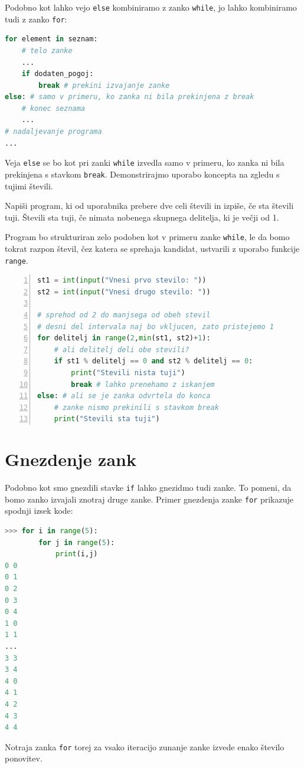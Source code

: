 Podobno kot lahko vejo \texttt{else} kombiniramo z zanko \texttt{while}, jo lahko kombiniramo tudi z zanko \texttt{for}:
\begin{lstlisting}[language=Python, showstringspaces=false]
for element in seznam:
    # telo zanke
    ...
    if dodaten_pogoj:
        break # prekini izvajanje zanke
else: # samo v primeru, ko zanka ni bila prekinjena z break
    # konec seznama
    ...
# nadaljevanje programa
...
\end{lstlisting}

Veja \texttt{else} se bo kot pri zanki \texttt{while} izvedla samo v primeru, ko zanka ni bila prekinjena s stavkom \texttt{break}. Demonstrirajmo uporabo koncepta na zgledu s tujimi števili.

\begin{zgled}
Napiši program, ki od uporabnika prebere dve celi števili in izpiše, če sta števili tuji. Števili sta tuji, če nimata nobenega skupnega delitelja, ki je večji od 1.
\end{zgled}
\begin{resitev}
Program bo strukturiran zelo podoben kot v primeru zanke \texttt{while}, le da bomo tokrat razpon števil, čez katera se sprehaja kandidat, ustvarili z uporabo funkcije \texttt{range}. 

\begin{lstlisting}[language=Python, showstringspaces=false,numbers=left]
st1 = int(input("Vnesi prvo stevilo: "))
st2 = int(input("Vnesi drugo stevilo: "))

# sprehod od 2 do manjsega od obeh stevil
# desni del intervala naj bo vkljucen, zato pristejemo 1
for delitelj in range(2,min(st1, st2)+1):
    # ali delitelj deli obe stevili?
    if st1 % delitelj == 0 and st2 % delitelj == 0:
        print("Stevili nista tuji")
        break # lahko prenehamo z iskanjem
else: # ali se je zanka odvrtela do konca
    # zanke nismo prekinili s stavkom break
    print("Stevili sta tuji")
\end{lstlisting}
\end{resitev}


\section{Gnezdenje zank}

Podobno kot smo gnezdili stavke \texttt{if} lahko gnezidmo tudi zanke. To pomeni, da bomo zanko izvajali znotraj druge zanke. Primer gnezdenja zanke \texttt{for} prikazuje spodnji izsek kode:
\begin{lstlisting}[language=Python, showstringspaces=false]
>>> for i in range(5):
        for j in range(5):
            print(i,j)
0 0
0 1
0 2
0 3
0 4
1 0
1 1
...
3 3
3 4
4 0
4 1
4 2
4 3
4 4
\end{lstlisting}
Notraja zanka \texttt{for} torej za vsako iteracijo zunanje zanke izvede enako število ponovitev.

